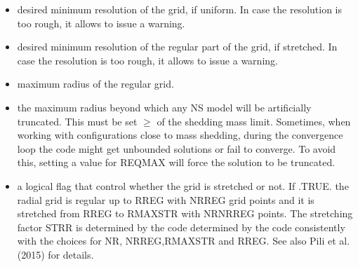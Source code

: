 \documentclass[letterpaper,10pt,english]{sphinxmanual}
\begin{document}
\begin{itemize}
\item {} 
\sphinxAtStartPar
{} \sphinxhyphen{} desired minimum resolution of the grid, if uniform. In case the resolution is too rough, it allows to issue a warning.


\item {} 
\sphinxAtStartPar
{} \sphinxhyphen{} desired minimum resolution of the regular part of the grid, if stretched. In case the resolution is too rough, it allows to issue a warning.


\item {} 
\sphinxAtStartPar
{} \sphinxhyphen{} maximum radius of the regular grid.


\item {} 
\sphinxAtStartPar
{} \sphinxhyphen{} the maximum radius beyond which any NS model will be artificially truncated. This must
be set \(\geq\) of the shedding mass limit. Sometimes, when working with configurations close to mass
shedding, during the convergence loop the code might get unbounded solutions or fail to converge. To
avoid this, setting a value for REQMAX will force the solution to be truncated.


\item {} 
\sphinxAtStartPar
{} \sphinxhyphen{} a logical flag that control whether the grid is stretched or not. If .TRUE. the radial grid
is regular up to RREG with NRREG grid points and it is stretched from RREG to RMAXSTR with NR\sphinxhyphen{}NRREG
points. The stretching factor STRR is determined by the code determined by the code consistently with
the choices for NR, NRREG,RMAXSTR and RREG. See also Pili et al. (2015) for details.

\end{itemize}
\end{document}

